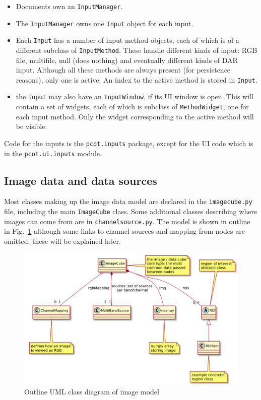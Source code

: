 \begin{itemize}
\item Documents own an \texttt{InputManager}.
\item The \texttt{InputManager} owns one \texttt{Input} object for each input.
\item Each \texttt{Input} has a number of input method objects,
each of which is of a different subclass of \texttt{InputMethod}.
These handle different kinds of input: RGB file, multifile, null (does nothing)
and eventually different kinds of DAR input. Although all these methods are
always present (for persistence reasons), only one is active. An index
to the active method is stored in \texttt{Input}.
\item the \texttt{Input} may also have an \texttt{InputWindow}, if its
UI window is open. This will contain a set of widgets, each of which is
subclass of \texttt{MethodWidget}, one for each input method. Only the widget
corresponding to the active method will be visible.
\end{itemize}
Code for the inputs is the \texttt{pcot.inputs} package, except for the UI
code which is in the \texttt{pcot.ui.inputs} module.
\clearpage

\subsection{Image data and data sources}
Most classes making up the image data model are declared in the
\texttt{imagecube.py} file, including the main \texttt{ImageCube} class.
Some additional classes describing where images can come from are in
\texttt{channelsource.py}. The model is shown in outline in
Fig.~\ref{image.pdf} although some links to channel sources and mapping from
nodes are omitted; these will be explained later.

\begin{figure}[ht]
\center
\includegraphics[width=5in]{image.pdf}
\caption{Outline UML class diagram of image model}
\label{image.pdf}
\end{figure}

